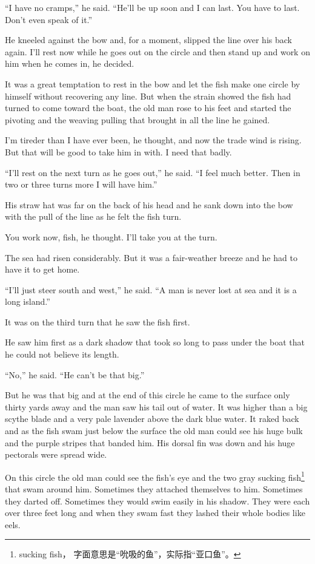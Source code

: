 \documentclass[fontset=ubuntu,zihao=-4]{ctexrep}
\begin{document}
``I have no cramps,'' he said. ``He'll be up soon and I can last. You have
to last. Don't even speak of it.''

He kneeled against the bow and, for a moment, slipped the line over his back
again. I'll rest now while he goes out on the circle and then stand up and
work on him when he comes in, he decided.

It was a great temptation to rest in the bow and let the fish make one
circle by himself without recovering any line. But when the strain showed
the fish had turned to come toward the boat, the old man rose to his feet
and started the pivoting and the \gls{weaving} pulling that brought in all the
line he gained.

I'm tireder than I have ever been, he thought, and now the trade wind is
rising. But that will be good to take him in with. I need that badly.

``I'll rest on the next turn as he goes out,'' he said. ``I feel much
better. Then in two or three turns more I will have him.''

His straw hat was far on the back of his head and he sank down into the bow
with the pull of the line as he felt the fish turn.

You work now, fish, he thought. I'll take you at the turn.

The sea had risen \gls{considerably}. But it was a \gls{fair-weather} breeze and
he had to have it to get home.

``I'll just \gls{steer} south and west,'' he said. ``A man is never lost at sea
and it is a long island.''

It was on the third turn that he saw the fish first.

He saw him first as a dark shadow that took so long to pass under the boat
that he could not believe its length.

``No,'' he said. ``He can't be that big.''

But he was that big and at the end of this circle he came to the surface
only thirty yards away and the man saw his tail out of water. It was higher
than a big scythe blade and a very \gls{pale} lavender above the dark blue
water. It \gls{raked} back and as the fish swam just below the surface the
old man could see his huge \gls{bulk} and the purple stripes that
\gls{banded} him. His \gls{dorsal} fin was down and his huge pectorals
were spread wide.

On this circle the old man could see the fish's eye and the two gray sucking
fish\footnote{sucking fish， 字面意思是“吮吸的鱼”，实际指“亚口鱼”。}
that swam around him. Sometimes they \gls{attached} themselves to him.
Sometimes they \gls{darted} off. Sometimes they would swim easily in his
shadow. They were each over three feet long and when they swam fast they
\gls{lashed} their whole bodies like \glspl{eel}.
\end{document}
